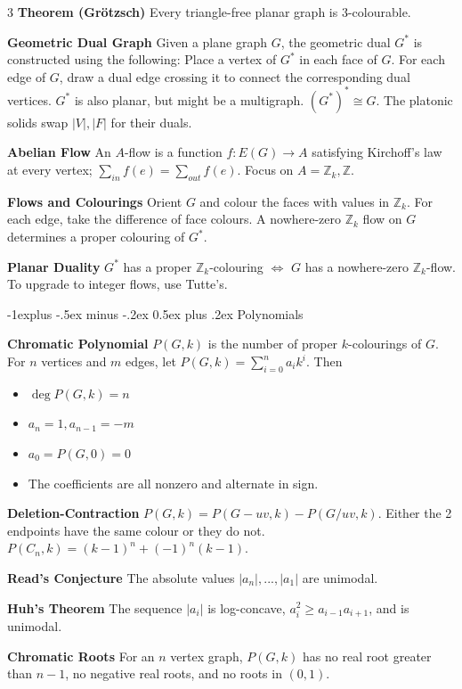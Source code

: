\documentclass[10pt, landscape]{article}
\makeatletter
\renewcommand{\section}{\@startsection{section}{1}{0mm}%
                                {-1ex plus -.5ex minus -.2ex}%
                                {0.5ex plus .2ex}%
                                {\normalfont\large\bfseries}}
\renewcommand{\section}{\@startsection{section}{2}{0mm}%
                                {-1explus -.5ex minus -.2ex}%
                                {0.5ex plus .2ex}%
                                {\normalfont\normalsize\bfseries}}
\makeatother
\begin{document}
\begin{multicols*}{3}
\textbf{Theorem (Grötzsch)} Every triangle-free planar graph is 3-colourable.

\textbf{Geometric Dual Graph} Given a plane graph $G$, the geometric dual $G^*$ is constructed using the following: Place a vertex of $G^*$ in each face of $G$. For each edge of $G$, draw a dual edge crossing it to connect the corresponding dual vertices. $G^*$ is also planar, but might be a multigraph. $(G^*)^*\cong G$. The platonic solids swap $|V|,|F|$ for their duals.

\textbf{Abelian Flow} An $A$-flow is a function $f:E(G) \rightarrow A$ satisfying Kirchoff's law at every vertex; $\sum_{in} f(e)=\sum_{out} f(e)$. Focus on $A=\mathbb{Z}_k, \mathbb{Z}$.

\textbf{Flows and Colourings} Orient $G$ and colour the faces with values in $\mathbb{Z}_k$. For each edge, take the difference of face colours. A nowhere-zero $\mathbb{Z}_k$ flow on $G$ determines a proper colouring of $G^*$.

\textbf{Planar Duality} $G^*$ has a proper $\mathbb{Z}_k$-colouring $\Leftrightarrow$ $G$ has a nowhere-zero $\mathbb{Z}_k$-flow. To upgrade to integer flows, use Tutte's.

\section{Polynomials}

\textbf{Chromatic Polynomial} $P(G,k)$ is the number of proper $k$-colourings of $G$. For $n$ vertices and $m$ edges, let $P(G,k)=\sum_{i=0}^n a_i k^i$. Then
\begin{itemize}
    \item $\deg P(G,k)=n$
    \item $a_n=1, a_{n-1}=-m$
    \item $a_0=P(G,0)=0$
    \item The coefficients are all nonzero and alternate in sign.
\end{itemize}

\textbf{Deletion-Contraction} $P(G,k)=P(G-uv,k)-P(G/uv, k)$. Either the 2 endpoints have the same colour or they do not. $P(C_n, k)=(k-1)^n+(-1)^n(k-1)$.

\textbf{Read's Conjecture} The absolute values $|a_n|,...,|a_1|$ are unimodal.

\textbf{Huh's Theorem} The sequence $|a_i|$ is log-concave, $a_i^2 \geq a_{i-1}a_{i+1}$, and is unimodal.

\textbf{Chromatic Roots} For an $n$ vertex graph, $P(G,k)$ has no real root greater than $n-1$, no negative real roots, and no roots in $(0,1)$.


\end{multicols*}
\end{document}
